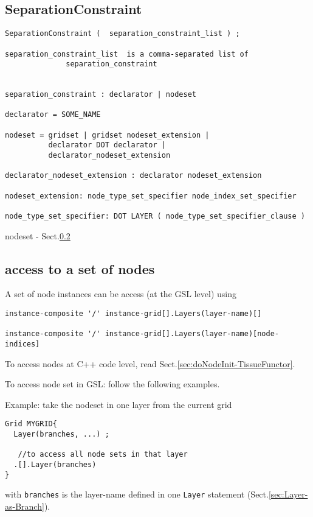 \subsection{SeparationConstraint}
\label{sec:GSL-SeparationConstraint}

\begin{verbatim}
SeparationConstraint (  separation_constraint_list ) ;

separation_constraint_list  is a comma-separated list of
              separation_constraint
              

separation_constraint : declarator | nodeset 

declarator = SOME_NAME

nodeset = gridset | gridset nodeset_extension |
          declarator DOT declarator |
          declarator_nodeset_extension
          
declarator_nodeset_extension : declarator nodeset_extension

nodeset_extension: node_type_set_specifier node_index_set_specifier

node_type_set_specifier: DOT LAYER ( node_type_set_specifier_clause )
\end{verbatim}

nodeset - Sect.\ref{sec:NodeSet-GSL}

\subsection{access to a set of nodes}
\label{sec:NodeSet-GSL}


A set of node instances can be access (at the GSL level) using
\begin{verbatim}
instance-composite '/' instance-grid[].Layers(layer-name)[]

instance-composite '/' instance-grid[].Layers(layer-name)[node-indices]
\end{verbatim} 
To access nodes at C++ code level, read Sect.\ref{sec:doNodeInit-TissueFunctor}.

To access node set in GSL: follow the following examples.

Example: take the nodeset in one layer from the current grid
\begin{verbatim}
Grid MYGRID{
  Layer(branches, ...) ; 
  
   //to access all node sets in that layer
  .[].Layer(branches)
}
\end{verbatim}
with \verb!branches! is the layer-name defined in one \verb!Layer! statement
(Sect.\ref{sec:Layer-as-Branch}).

